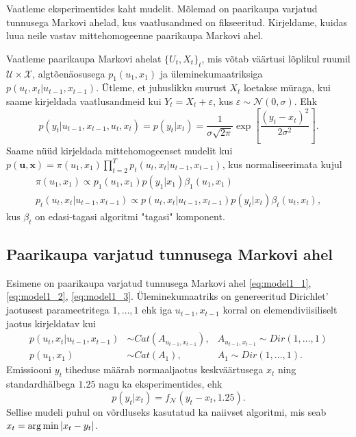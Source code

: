 Vaatleme eksperimentides kaht mudelit. Mõlemad on paarikaupa varjatud tunnusega Markovi ahelad, kus vaatlusandmed on fikseeritud. Kirjeldame, kuidas luua neile vastav mittehomogeenne paarikaupa Markovi ahel.

Vaatleme paarikaupa Markovi ahelat $\{U_t,X_t\}_t$, mis võtab väärtusi lõplikul ruumil $\mathcal{U} \times \mathcal{X}$, algtõenäosusega $p_1(u_1,x_1)$ ja üleminekumaatriksiga $p(u_t,x_t | u_{t-1},x_{t-1})$. Ütleme, et juhuslikku suurust $X_t$ loetakse müraga, kui saame kirjeldada vaatlusandmeid kui $Y_t = X_t + \varepsilon$, kus $\varepsilon \sim \mathcal{N}(0, \sigma)$. Ehk 
$$p(y_t|u_{t-1},x_{t-1},u_t,x_t) = p(y_t|x_t) = \frac{1}{\sigma\sqrt{2\pi}}\exp\left[ \frac{(y_t-x_t)^2}{2\sigma^2} \right].$$
Saame nüüd kirjeldada mittehomogeenset mudelit kui $p(\bm{u},\bm{x}) = \pi(u_1,x_1) \prod_{t=2}^T p_t(u_t,x_t|u_{t-1},x_{t-1})$, kus normaliseerimata kujul
\begin{align*}
    \pi(u_1,x_1) \propto p_1(u_1,x_1)p(y_1|x_1)\beta_1(u_1,x_1)\\
    p_t(u_t,x_t|u_{t-1},x_{t-1}) \propto p(u_t,x_t|u_{t-1},x_{t-1}) p(y_t|x_t) \beta_t(u_t,x_t),
\end{align*}
kus $\beta_t$ on edasi-tagasi algoritmi "tagasi" komponent.

\subsection{Paarikaupa varjatud tunnusega Markovi ahel}\label{sec:experiments_PMM}

Esimene on paarikaupa varjatud tunnusega Markovi ahel \eqref{eq:model1_1}, \eqref{eq:model1_2}, \eqref{eq:model1_3}. Üleminekumaatriks on genereeritud Dirichlet' jaotusest parameetritega $1,\ldots,1$ ehk iga $u_{t-1},x_{t-1}$ korral on elemendiviisiliselt jaotus kirjeldatav kui
\begin{align}
    \label{eq:hmm1}
    p(u_t,x_t | u_{t-1},x_{t-1}) &\sim Cat(A_{u_{t-1},x_{t-1}}),& A_{u_{t-1},x_{t-1}} \sim Dir(1,\ldots,1)\\
    \label{eq:hmm2}
    p(u_1,x_1) &\sim Cat(A_1), &A_1 \sim Dir(1,\ldots,1) .
\end{align}
Emissiooni $y_t$ tiheduse määrab normaaljaotus keskväärtusega $x_t$ ning standardhälbega $1.25$ nagu ka \parencite{Soop.2023} eksperimentides, ehk 
\begin{equation}
    \label{eq:hmm3}
    p(y_t|x_t) = f_{\mathcal{N}}(y_t-x_t,1.25).
\end{equation}
Sellise mudeli puhul on võrdluseks kasutatud ka naiivset algoritmi, mis seab $x_t = \operatorname*{arg\,min} |x_t - y_t|$.

